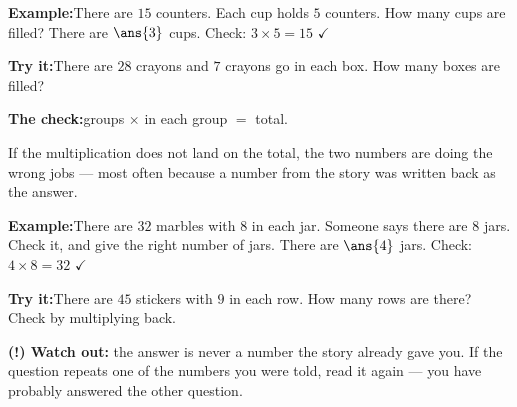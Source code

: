 \documentclass[12pt]{article}
\begin{document}
\begin{examplebox}
\textbf{Example:}\quad There are $15$ counters. Each cup holds $5$ counters. How
many cups are filled?
There are $\ans{3}$ cups. Check: $3 \times 5 = 15$ $\checkmark$
\end{examplebox}

\begin{tryitbox}
\textbf{Try it:}\quad There are $28$ crayons and $7$ crayons go in each box. How
many boxes are filled?\\[2pt]
\end{tryitbox}


\begin{formulabox}
\textbf{The check:}\quad groups $\times$ in each group $=$ total.\par
\smallskip
If the multiplication does not land on the total, the two numbers are doing the
wrong jobs --- most often because a number from the story was written back as
the answer.
\end{formulabox}

\begin{examplebox}
\textbf{Example:}\quad There are $32$ marbles with $8$ in each jar. Someone says
there are $8$ jars. Check it, and give the right number of jars.
There are $\ans{4}$ jars. Check: $4 \times 8 = 32$ $\checkmark$
\end{examplebox}

\begin{tryitbox}
\textbf{Try it:}\quad There are $45$ stickers with $9$ in each row. How many rows
are there? Check by multiplying back.\\[2pt]
\end{tryitbox}

\begin{watchoutbox}
\textbf{(!) Watch out:} the answer is never a number the story already gave you.
If the question repeats one of the numbers you were told, read it again --- you
have probably answered the other question.
\end{watchoutbox}
\end{document}
